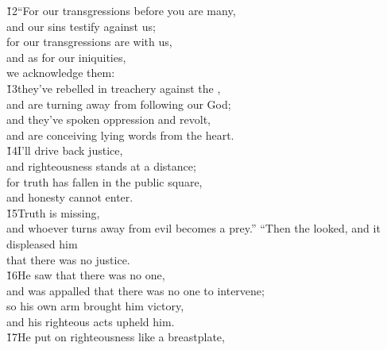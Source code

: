 \begin{poetry}
\poeml \v{12}``For our transgressions before you are many, \\
\poemll    and our sins testify against us; \\
\poeml for our transgressions are with us, \\
\poemll    and as for our iniquities, \\
\poemlll       we acknowledge them: \\
\poeml \v{13}they've rebelled in treachery against the , \\
\poemll    and are turning away from following our God; \\
\poeml and they've spoken oppression and revolt, \\
\poemll    and are conceiving lying words from the heart. \\
\poeml \v{14}I'll drive back justice, \\
\poemll    and righteousness stands at a distance; \\
\poeml for truth has fallen in the public square, \\
\poemll    and honesty cannot enter. \\
\poeml \v{15}Truth is missing, \\
\poemll    and whoever turns away from evil becomes a prey.''
\poeml ``Then the  looked, and it displeased him \\
\poemll    that there was no justice. \\
\poeml \v{16}He saw that there was no one, \\
\poemll    and was appalled that there was no one to intervene; \\
\poeml so his own arm brought him victory, \\
\poemll    and his righteous acts upheld him. \\
\poeml \v{17}He put on righteousness like a breastplate, \\

\end{poetry}
